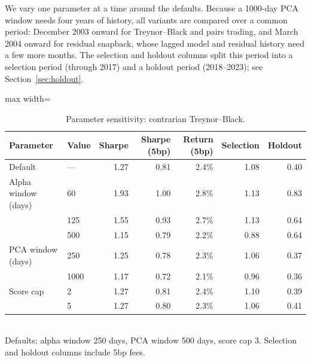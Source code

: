 \documentclass[12pt,letterpaper]{article}
\begin{document}
We vary one parameter at a time around the defaults. Because a 1000-day PCA window needs four years of history, all variants are compared over a common period: December 2003 onward for Treynor--Black and pairs trading, and March 2004 onward for residual snapback, whose lagged model and residual history need a few more months. The selection and holdout columns split this period into a selection period (through 2017) and a holdout period (2018--2023); see Section~\ref{sec:holdout}.

\begin{table}[!htbp]
\centering
\caption{Parameter sensitivity: contrarian Treynor--Black.}
\label{tab:sensitivity-tb}
\begin{adjustbox}{max width=\linewidth}
\begin{tabular}{llrrrrr}
\toprule
Parameter & Value & Sharpe & Sharpe (5bp) & Return (5bp) & Selection & Holdout \\
\midrule
Default & --- & 1.27 & 0.81 & 2.4\% & 1.08 & 0.40 \\
Alpha window (days) & 60 & 1.93 & 1.00 & 2.8\% & 1.13 & 0.83 \\
& 125 & 1.55 & 0.93 & 2.7\% & 1.13 & 0.64 \\
& 500 & 1.15 & 0.79 & 2.2\% & 0.88 & 0.64 \\
PCA window (days) & 250 & 1.25 & 0.78 & 2.3\% & 1.06 & 0.37 \\
& 1000 & 1.17 & 0.72 & 2.1\% & 0.96 & 0.36 \\
Score cap & 2 & 1.27 & 0.81 & 2.4\% & 1.10 & 0.39 \\
& 5 & 1.27 & 0.80 & 2.3\% & 1.06 & 0.41 \\
\bottomrule
\end{tabular}
\end{adjustbox}
\\[4pt]
\small Defaults: alpha window 250 days, PCA window 500 days, score cap 3. Selection and holdout columns include 5bp fees.
\end{table}
\end{document}
